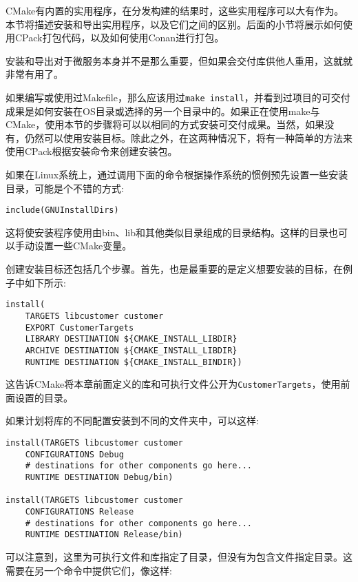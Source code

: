 
CMake有内置的实用程序，在分发构建的结果时，这些实用程序可以大有作为。本节将描述安装和导出实用程序，以及它们之间的区别。后面的小节将展示如何使用CPack打包代码，以及如何使用Conan进行打包。

安装和导出对于微服务本身并不是那么重要，但如果会交付库供他人重用，这就就非常有用了。


如果编写或使用过Makefile，那么应该用过\texttt{make install}，并看到过项目的可交付成果是如何安装在OS目录或选择的另一个目录中的。如果正在使用make与CMake，使用本节的步骤将可以以相同的方式安装可交付成果。当然，如果没有，仍然可以使用安装目标。除此之外，在这两种情况下，将有一种简单的方法来使用CPack根据安装命令来创建安装包。

如果在Linux系统上，通过调用下面的命令根据操作系统的惯例预先设置一些安装目录，可能是个不错的方式:

\begin{lstlisting}[style=styleCMake]
include(GNUInstallDirs)
\end{lstlisting}

这将使安装程序使用由bin、lib和其他类似目录组成的目录结构。这样的目录也可以手动设置一些CMake变量。

创建安装目标还包括几个步骤。首先，也是最重要的是定义想要安装的目标，在例子中如下所示:

\begin{lstlisting}[style=styleCMake]
install(
	TARGETS libcustomer customer
	EXPORT CustomerTargets
	LIBRARY DESTINATION ${CMAKE_INSTALL_LIBDIR}
	ARCHIVE DESTINATION ${CMAKE_INSTALL_LIBDIR}
	RUNTIME DESTINATION ${CMAKE_INSTALL_BINDIR})
\end{lstlisting}

这告诉CMake将本章前面定义的库和可执行文件公开为\texttt{CustomerTargets}，使用前面设置的目录。

如果计划将库的不同配置安装到不同的文件夹中，可以这样:

\begin{lstlisting}[style=styleCMake]
install(TARGETS libcustomer customer
	CONFIGURATIONS Debug
	# destinations for other components go here...
	RUNTIME DESTINATION Debug/bin)
	
install(TARGETS libcustomer customer
	CONFIGURATIONS Release
	# destinations for other components go here...
	RUNTIME DESTINATION Release/bin)
\end{lstlisting}

可以注意到，这里为可执行文件和库指定了目录，但没有为包含文件指定目录。这需要在另一个命令中提供它们，像这样:

